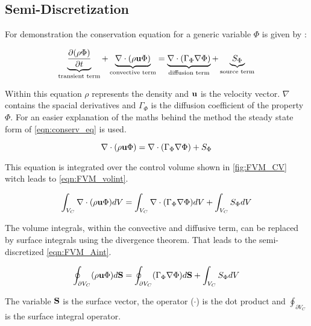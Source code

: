 \documentclass[../thesis.tex]{subfiles}
\begin{document}
\subsection{Semi-Discretization}

For demonstration the conservation equation for a generic variable $ \Phi $ is given by \cite{darwish2021finite}:

\begin{equation}
	\label{eqn:conserv_eq}
	\underbrace{\dfrac{\partial(\rho \Phi)}{\partial t}}_{\text{transient term}} + \underbrace{\nabla \cdot (\rho \bold{u} \Phi)}_{\text{convective term}} = \underbrace{\nabla \cdot (\Gamma_\Phi \nabla \Phi)}_{\text{diffusion term}} + \underbrace{S_\Phi}_{\text{source term}}
\end{equation}

Within this equation $ \rho $ represents the density and $ \bold{u} $ is the velocity vector. $ \nabla $ contains the spacial derivatives and $ \Gamma_\Phi $ is the diffusion coefficient of the property $ \Phi $.
For an easier explanation of the maths behind the method the steady state form of \autoref{eqn:conserv_eq} is used.

\begin{equation}
	\nabla \cdot (\rho \bold{u} \Phi) = \nabla \cdot (\Gamma_\Phi \nabla \Phi) + S_\Phi
\end{equation}

This equation is integrated over the control volume shown in \autoref{fig:FVM_CV} witch leads to \autoref{eqn:FVM_volint}.

\begin{equation}
	\label{eqn:FVM_volint}
	\int_{V_C} \nabla \cdot (\rho \bold{u} \Phi) dV = \int_{V_C} \nabla \cdot (\Gamma_\Phi \nabla \Phi) dV + \int_{V_C} S_\Phi dV
\end{equation}

The volume integrals, within the convective and diffusive term, can be replaced by surface integrals using the divergence theorem. That leads to the semi-discretized \autoref{eqn:FVM_Aint}.

\begin{equation}
	\label{eqn:FVM_Aint}
	\oint_{\partial V_C} (\rho \bold{u} \Phi) d\bold{S} = \oint_{\partial V_C} (\Gamma_\Phi \nabla \Phi) d\bold{S} + \int_{V_C} S_\Phi dV
\end{equation}

The variable $ \bold{S}$ is the surface vector, the operator ($\cdot$) is the dot product and $ \oint_{\partial V_C}$ is the surface integral operator.
\end{document}
